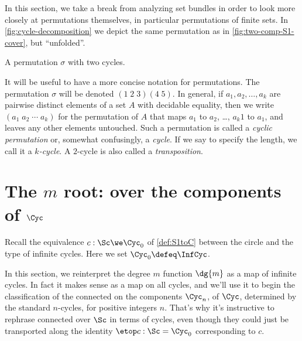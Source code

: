 In this section, we take a break from analyzing set bundles in order to look more closely at permutations themselves, in particular permutations of finite sets.
In \cref{fig:cycle-decomposition} we depict the same permutation as in \cref{fig:two-comp-S1-cover}, but ``unfolded''.
\begin{marginfigure}
  \caption{A permutation $\sigma$ with two cycles.}
  \label{fig:cycle-decomposition}
\end{marginfigure}
It will be useful to have a more concise notation for permutations.
The permutation $\sigma$ will be denoted $(1\;2\;3)(4\;5)$.
In general, if $a_1,a_2,\dots,a_k$ are pairwise distinct elements of a set $A$ with decidable equality,
then we write $(a_1\;a_2\;\cdots\;a_k)$ for the permutation of $A$
that maps $a_1$ to $a_2$, \ldots, $a_k1$ to $a_1$, and leaves any other elements untouched.
Such a permutation is called a \emph{cyclic permutation} or, somewhat confusingly, a \emph{cycle}.
If we say to specify the length, we call it a \emph{$k$-cycle}.
A $2$-cycle is also called a \emph{transposition}.
\begin{remark}
\end{remark}

\section{The \texorpdfstring{$m$\th}{mᵗʰ} root:
  \coverings over the components of $\Cyc$}

Recall the equivalence $c : \Sc \we \Cyc_0$ of \cref{def:S1toC}
between the circle and the type of infinite cycles.
Here we set $\Cyc_0 \defeq \InfCyc$.

In this section, we reinterpret the degree $m$ function $\dg{m}$
as a map of infinite cycles. In fact it makes sense as a map on all cycles,
and we'll use it to begin the classification
of the connected \coverings on the components $\Cyc_n$,
of $\Cyc$, determined by the standard $n$-cycles, for positive integers $n$.
That's why it's instructive to rephrase connected \coverings over $\Sc$
in terms of cycles,
even though they could just be transported along the identity $\etop c:\Sc=\Cyc_0$ corresponding to $c$.

